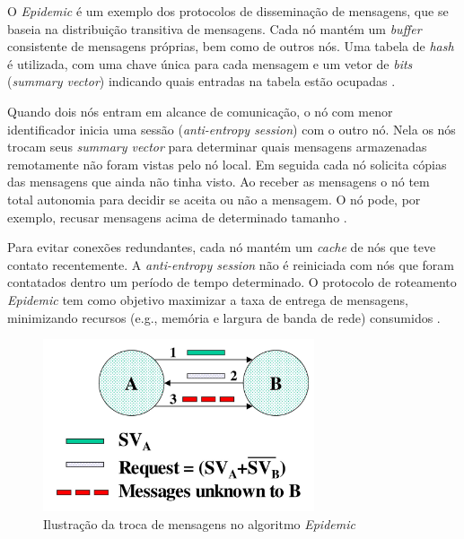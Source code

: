 \documentclass[mestrado, pre-defesa, english, brazil]{packages/icmc}
\begin{document}

O \textit{Epidemic} é um exemplo dos protocolos de disseminação de mensagens, que se baseia na distribuição transitiva de mensagens. Cada nó mantém um \textit{buffer} consistente de mensagens próprias, bem como de outros nós. Uma tabela de \textit{hash} é utilizada, com uma chave única para cada mensagem e um vetor de \textit{bits} (\textit{summary vector}) indicando quais entradas na tabela estão ocupadas \cite{Vahdat-2000,oliveira-2010}. 

Quando dois nós entram em alcance de comunicação, o nó com menor identificador inicia uma sessão (\textit{anti-entropy session}) com o outro nó. Nela os nós trocam seus \textit{summary vector} para determinar quais mensagens armazenadas remotamente não foram vistas pelo nó local. Em seguida cada nó solicita cópias das mensagens que ainda não tinha visto. Ao receber as mensagens o nó tem total autonomia para decidir se aceita ou não a mensagem. O nó pode, por exemplo, recusar mensagens acima de determinado tamanho \cite{Vahdat-2000}.

Para evitar conexões redundantes, cada nó mantém um \textit{cache} de nós que teve contato recentemente. A \textit{anti-entropy session} não é reiniciada com nós que foram contatados dentro um período de tempo determinado. O protocolo de roteamento \textit{Epidemic} tem como objetivo maximizar a taxa de entrega de mensagens, minimizando recursos (e.g., memória e largura de banda de rede) consumidos \cite{Vahdat-2000,oliveira-2010}.

\begin{figure}[!htbp]
	\centering
	\caption{\label{fig:epidemic} Ilustração da troca de mensagens no algoritmo \emph{Epidemic}}
	\includegraphics[width=8cm]{img/epidemic.jpeg}
\end{figure}
\end{document}
